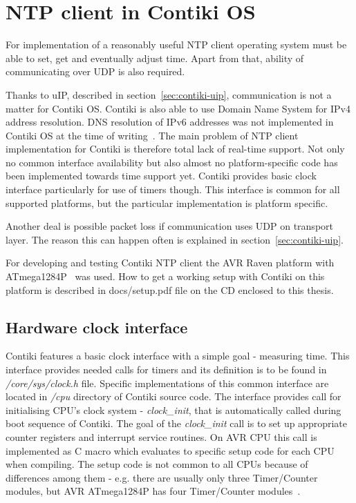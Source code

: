 
\chapter{NTP client in Contiki OS}
For implementation of a reasonably useful NTP client
operating system must be able to set, get
and eventually adjust time.
Apart from that, ability of communicating over UDP is also required.

Thanks to uIP, described in section~\ref{sec:contiki-uip}, communication is
not a matter for Contiki OS.
Contiki is also able to use Domain Name System for IPv4 address resolution.
DNS resolution of IPv6 addresses was not implemented in Contiki OS
at the time of writing~\cite{contiki-docs}.
The main problem of NTP client implementation for Contiki is therefore total
lack of real-time support.
Not only no common interface availability but also
almost no platform-specific code has been implemented towards time support yet.
Contiki provides basic clock interface particularly for use of timers though.
This interface is common for all supported platforms,
but the particular implementation is platform specific.

Another deal is possible packet loss if communication uses UDP on transport layer.
The reason this can happen often is explained in section~\ref{sec:contiki-uip}.

For developing and testing Contiki NTP client the AVR Raven platform with ATmega1284P~\cite{avr-datasheet} was used.
How to get a working setup with Contiki on this platform is described in
docs/setup.pdf file on the CD enclosed to this thesis.

\section{Hardware clock interface}
Contiki features a basic clock interface with a simple goal - measuring time.
This interface provides needed calls for timers and its definition is to be found in {\it{/core/sys/clock.h}} file.
Specific implementations of this common interface are located in {\it{/cpu}} directory of Contiki source code.
The interface provides call for initialising CPU's clock system - {\it{clock\_init}}, that is automatically called during
boot sequence of Contiki.
The goal of the {\it{clock\_init}} call is to set up
appropriate counter registers and interrupt service routines. %
On AVR CPU this call is implemented as C macro which evaluates to specific setup code for each CPU
when compiling.
The setup code is not common to all CPUs because of differences among them - e.g. there are usually
only three Timer/Counter modules, but AVR ATmega1284P has four Timer/Counter modules~\cite{avr-datasheet}.

